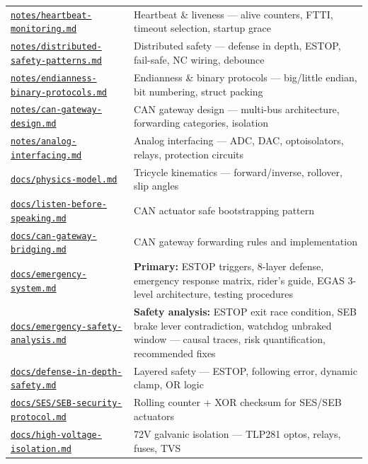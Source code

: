 \documentclass[12pt,a4paper,oneside]{report}
\begin{document}
\begin{longtable}[]{@{}
  >{\raggedright\arraybackslash}p{}
  >{\raggedright\arraybackslash}p{}@{}}
\href{notes/heartbeat-monitoring.md}{\texttt{notes/heartbeat-monitoring.md}} &
Heartbeat \& liveness --- alive counters, FTTI, timeout selection, startup
grace \\
\href{notes/distributed-safety-patterns.md}{\texttt{notes/distributed-safety-patterns.md}}
& Distributed safety --- defense in depth, ESTOP, fail-safe, NC wiring,
debounce \\
\href{notes/endianness-binary-protocols.md}{\texttt{notes/endianness-binary-protocols.md}}
& Endianness \& binary protocols --- big/little endian, bit numbering, struct
packing \\
\href{notes/can-gateway-design.md}{\texttt{notes/can-gateway-design.md}} & CAN
gateway design --- multi-bus architecture, forwarding categories, isolation \\
\href{notes/analog-interfacing.md}{\texttt{notes/analog-interfacing.md}} &
Analog interfacing --- ADC, DAC, optoisolators, relays, protection circuits \\
\href{docs/physics-model.md}{\texttt{docs/physics-model.md}} & Tricycle
kinematics --- forward/inverse, rollover, slip angles \\
\href{docs/listen-before-speaking.md}{\texttt{docs/listen-before-speaking.md}} &
CAN actuator safe bootstrapping pattern \\
\href{docs/can-gateway-bridging.md}{\texttt{docs/can-gateway-bridging.md}} & CAN
gateway forwarding rules and implementation \\
\href{docs/emergency-system.md}{\texttt{docs/emergency-system.md}} &
\textbf{Primary:} ESTOP triggers, 8-layer defense, emergency response matrix,
rider's guide, EGAS 3-level architecture, testing procedures \\
\href{docs/emergency-safety-analysis.md}{\texttt{docs/emergency-safety-analysis.md}}
& \textbf{Safety analysis:} ESTOP exit race condition, SEB brake lever
contradiction, watchdog unbraked window --- causal traces, risk quantification,
recommended fixes \\
\href{docs/defense-in-depth-safety.md}{\texttt{docs/defense-in-depth-safety.md}}
& Layered safety --- ESTOP, following error, dynamic clamp, OR logic \\
\href{docs/SES/SEB-security-protocol.md}{\texttt{docs/SES/SEB-security-protocol.md}}
& Rolling counter + XOR checksum for SES/SEB actuators \\
\href{docs/high-voltage-isolation.md}{\texttt{docs/high-voltage-isolation.md}} &
72V galvanic isolation --- TLP281 optos, relays, fuses, TVS \\

\end{longtable}
\end{document}
